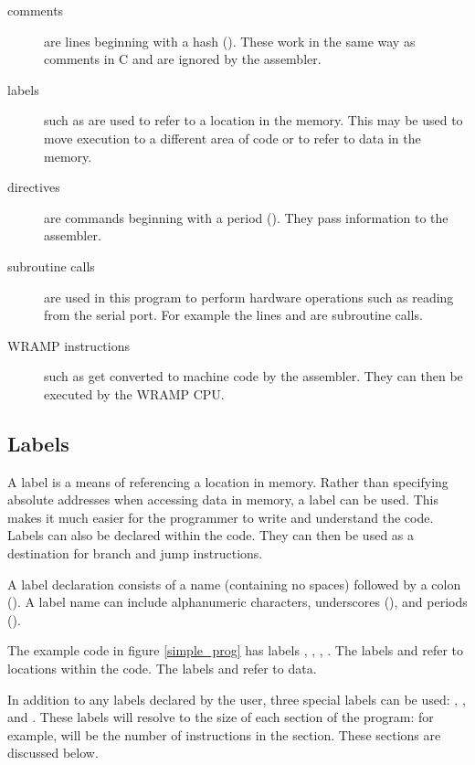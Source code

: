 \begin{description}
\item[comments] are lines beginning with a hash (\src{\#}). These work in
the same way as \src{//} comments in C and are ignored by the assembler.
%
\item[labels] such as  are used to refer to a location in the
memory. This may be used to move execution to a different area of code or
to refer to data in the memory.
%
\item[directives] are commands beginning with a period (). They
pass information to the assembler.
%
\item[subroutine calls] are used in this program to perform hardware
operations such as reading from the serial port. For example the
lines  and  are subroutine calls.
%
\item[WRAMP instructions] such as  get
converted to machine code by the assembler. They can then be executed by the
WRAMP CPU.
%
\end{description}

\subsection{Labels}
A label is a means of referencing a location in memory. Rather than
specifying absolute addresses when accessing data in memory, a label
can be used. This makes it much easier for the programmer to write
and understand the code. Labels can also be declared within the
code. They can then be used as a destination for branch and jump
instructions.

A label declaration consists of a name (containing no spaces) followed
by a colon (\src{:}). A label name can include alphanumeric characters,
underscores (\src{\_}), and periods ().

The example code in figure \ref{simple_prog} has labels ,
, , . The labels
 and  refer to locations within the code. The
labels  and  refer to data.

In addition to any labels declared by the user, three special labels
can be used: , , and .
These labels will resolve to the size of each section of the program:
for example,  will be the number of instructions
in the  section. These sections are discussed below.

